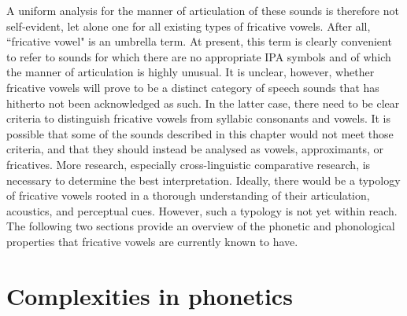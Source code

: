 \documentclass[output=paper,colorlinks,citecolor=brown,chinesefont]{langscibook}
\begin{document}
\newpage
A uniform analysis for the manner of articulation of these sounds is therefore not self-evident, let alone one for all existing types of fricative vowels. After all, ``fricative vowel" is an umbrella term. At present, this term is clearly convenient to refer to sounds for which there are no appropriate IPA symbols and of which the manner of articulation is highly unusual. It is unclear, however, whether fricative vowels will prove to be a distinct category of speech sounds that has hitherto not been acknowledged as such. In the latter case, there need to be clear criteria to distinguish fricative vowels from syllabic consonants and vowels. It is possible that some of the sounds described in this chapter would not meet those criteria, and that they should instead be analysed as vowels, approximants, or fricatives. More research, especially cross-linguistic comparative research, is necessary to determine the best interpretation. Ideally, there would be a typology of fricative vowels rooted in a thorough understanding of their articulation, acoustics, and perceptual cues. However, such a typology is not yet within reach. The following two sections provide an overview of the phonetic and phonological properties that fricative vowels are currently known to have.




\section{Complexities in phonetics}
\end{document}
